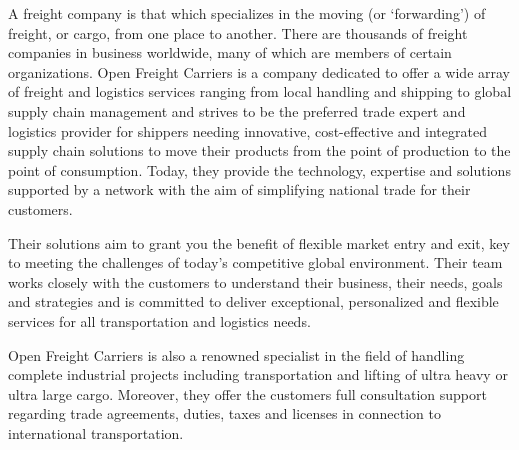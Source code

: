 A freight company is that which specializes in the moving (or \lq forwarding\rq)
of freight, or cargo, from one place to another. There are thousands 
of freight companies in business worldwide, many of which are members 
of certain organizations. Open Freight Carriers is a company dedicated 
to offer a wide array of freight and logistics services ranging from 
local handling and shipping to global supply chain management and 
strives to be the preferred trade expert and logistics provider for 
shippers needing innovative, cost-effective and integrated supply chain 
solutions to move their products from the point of production to the 
point of consumption. Today, they provide the technology, expertise 
and solutions supported by a network with the aim of simplifying 
national trade for their customers.

Their solutions aim to grant you the benefit of flexible market entry 
and exit, key to meeting the challenges of today's competitive global 
environment. Their team works closely with the customers to understand 
their business, their needs, goals and strategies and is committed to 
deliver exceptional, personalized and flexible services for all 
transportation and logistics needs.

Open Freight Carriers is also a renowned specialist in the field of 
handling complete industrial projects including transportation and 
lifting of ultra heavy or ultra large cargo. Moreover, they offer the 
customers full consultation support regarding trade agreements, duties, 
taxes and licenses in connection to international transportation.


